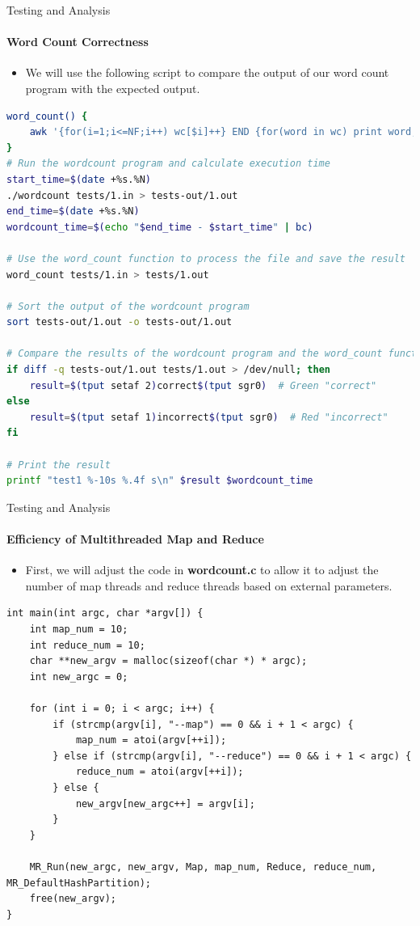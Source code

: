 \documentclass[10pt]{beamer}
\begin{document}
\begin{frame}[fragile]{Testing and Analysis}
    \framesubtitle{Word Count Correctness}
    \begin{itemize}
        \item We will use the following script to compare the output of our word count program with the expected output.
    \end{itemize}
    \begin{lstlisting}[language=bash]
word_count() {
    awk '{for(i=1;i<=NF;i++) wc[$i]++} END {for(word in wc) print word, wc[word]}' $@ | sort
}
# Run the wordcount program and calculate execution time
start_time=$(date +%s.%N)
./wordcount tests/1.in > tests-out/1.out
end_time=$(date +%s.%N)
wordcount_time=$(echo "$end_time - $start_time" | bc)

# Use the word_count function to process the file and save the result
word_count tests/1.in > tests/1.out

# Sort the output of the wordcount program
sort tests-out/1.out -o tests-out/1.out

# Compare the results of the wordcount program and the word_count function
if diff -q tests-out/1.out tests/1.out > /dev/null; then
    result=$(tput setaf 2)correct$(tput sgr0)  # Green "correct"
else
    result=$(tput setaf 1)incorrect$(tput sgr0)  # Red "incorrect"
fi

# Print the result
printf "test1 %-10s %.4f s\n" $result $wordcount_time
    \end{lstlisting}
\end{frame}

\begin{frame}[fragile]{Testing and Analysis}
    \framesubtitle{Efficiency of Multithreaded Map and Reduce}
    \begin{itemize}
        \item First, we will adjust the code in \textbf{wordcount.c} to allow it to adjust the number of map threads and reduce threads based on external parameters.
    \end{itemize}
    \begin{lstlisting}
int main(int argc, char *argv[]) {
    int map_num = 10;
    int reduce_num = 10;
    char **new_argv = malloc(sizeof(char *) * argc);
    int new_argc = 0;

    for (int i = 0; i < argc; i++) {
        if (strcmp(argv[i], "--map") == 0 && i + 1 < argc) {
            map_num = atoi(argv[++i]);
        } else if (strcmp(argv[i], "--reduce") == 0 && i + 1 < argc) {
            reduce_num = atoi(argv[++i]);
        } else {
            new_argv[new_argc++] = argv[i];
        }
    }

    MR_Run(new_argc, new_argv, Map, map_num, Reduce, reduce_num, MR_DefaultHashPartition);
    free(new_argv);
}
    \end{lstlisting}
\end{frame}
\end{document}
